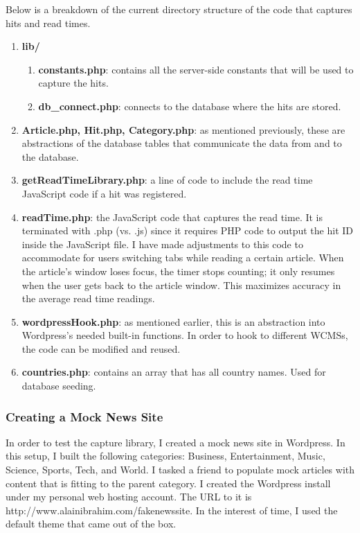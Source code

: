 \documentclass[12pt]{article}
\begin{document}
{\noindent Below is a breakdown of the current directory structure of the code that captures hits and read times.
\begin{enumerate}
\item \textbf{lib/}
\begin{enumerate}
\item \textbf{constants.php}: contains all the server-side constants that will be used to capture the hits.
\item \textbf{db\_connect.php}: connects to the database where the hits are stored.
\end{enumerate}
\item \textbf{Article.php, Hit.php, Category.php}: as mentioned previously, these are abstractions of the database tables that communicate the data from and to the database.
\item \textbf{getReadTimeLibrary.php}: a line of code to include the read time JavaScript code if a hit was registered.
\item \textbf{readTime.php}: the JavaScript code that captures the read time. It is terminated with .php (vs. .js) since it requires PHP code to output the hit ID inside the JavaScript file. I have made adjustments to this code to accommodate for users switching tabs while reading a certain article. When the article's window loses focus, the timer stops counting; it only resumes when the user gets back to the article window. This maximizes accuracy in the average read time readings.
\item \textbf{wordpressHook.php}: as mentioned earlier, this is an abstraction into Wordpress's needed built-in functions. In order to hook to different WCMSs, the code can be modified and reused. 
\item \textbf{countries.php}: contains an array that has all country names. Used for database seeding.
\end{enumerate}

\newpage

\subsubsection{Creating a Mock News Site} 
In order to test the capture library, I created a mock news site in Wordpress. In this setup, I built the following categories: Business, Entertainment, Music, Science, Sports, Tech, and World. I tasked a friend to populate mock articles with content that is fitting to the parent category. I created the Wordpress install under my personal web hosting account. The URL to it is http://www.alainibrahim.com/fakenewssite. In the interest of time, I used the default theme that came out of the box. \\

}
\end{document}
